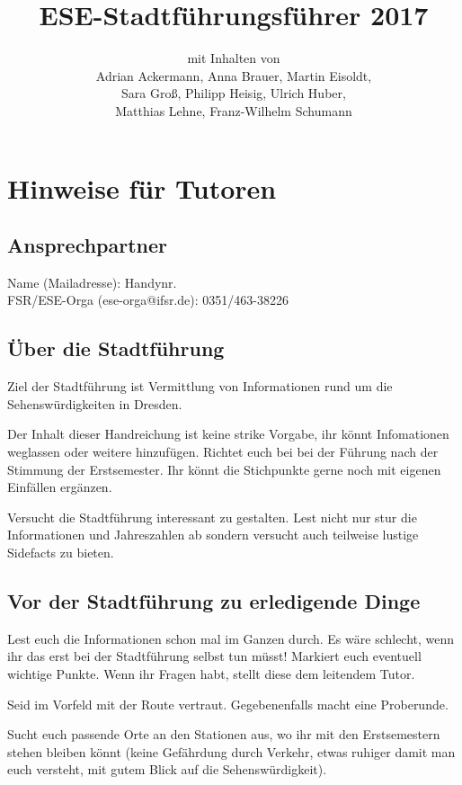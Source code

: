 \documentclass[a4paper,12pt]{report}
\begin{document}
\title{\textbf{ESE-Stadtführungsführer 2017}\\}
\date{}
\author{mit Inhalten von\\Adrian Ackermann, Anna Brauer, Martin Eisoldt,\\Sara Groß, Philipp Heisig, Ulrich Huber,\\ Matthias Lehne, Franz-Wilhelm Schumann}
\maketitle

\chapter{Hinweise für Tutoren}
\section{Ansprechpartner}
Name (Mailadresse): Handynr.\\
FSR/ESE-Orga (ese-orga@ifsr.de): 0351/463-38226


\section{Über die Stadtführung}
\begin{itemize*}
\item Ziel der Stadtführung ist Vermittlung von Informationen rund um die Sehenswürdigkeiten in Dresden.
\item Der Inhalt dieser Handreichung ist keine strike Vorgabe, ihr könnt Infomationen weglassen oder weitere hinzufügen.
Richtet euch bei bei der Führung nach der Stimmung der Erstsemester.
Ihr könnt die Stichpunkte gerne noch mit eigenen Einfällen ergänzen.
\item Versucht die Stadtführung interessant zu gestalten. Lest nicht nur stur die Informationen und Jahreszahlen ab sondern versucht auch teilweise lustige Sidefacts zu bieten.
\end{itemize*}

\section{Vor der Stadtführung zu erledigende Dinge}
\begin{itemize*}
\item Lest euch die Informationen schon mal im Ganzen durch.
Es wäre schlecht, wenn ihr das erst bei der Stadtführung selbst tun müsst!
Markiert euch eventuell wichtige Punkte.
Wenn ihr Fragen habt, stellt diese dem leitendem Tutor.
\item Seid im Vorfeld mit der Route vertraut. Gegebenenfalls macht eine Proberunde.
\item Sucht euch passende Orte an den Stationen aus, wo ihr mit den Erstsemestern stehen bleiben könnt (keine Gefährdung durch Verkehr, etwas ruhiger damit man euch versteht, mit gutem Blick auf die Sehenswürdigkeit).
\end{itemize*}
\end{document}
